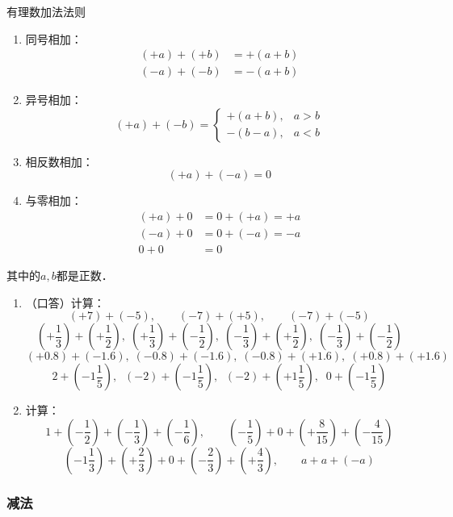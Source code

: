 \begin{blk}{有理数加法法则}
\begin{enumerate}
    \item 同号相加：
    \[\begin{split}
        (+a)+(+b)&=+(a+b)\\
      (-a)+(-b)&=-(a+b)
    \end{split}\]
    \item 异号相加：
    \[(+a)+(-b)=\begin{cases}
        +(a+b),& a>b\\
-(b-a),&a<b
    \end{cases}\]
    \item 相反数相加：
    \[(+a)+(-a)=0\]
    \item 与零相加：
    \[\begin{split}
        (+a)+0&=0+(+a)=+a\\
      (-a)+0&=0+(-a)=-a\\
    0+0&=0
    \end{split}\]
\end{enumerate}    
其中的$a,b$都是正数．
\end{blk}
      
\begin{ex}
\begin{enumerate}
    \item （口答）计算：
\[(+7)+(-5),\qquad (-7)+(+5),\qquad (-7)+(-5) \]
\[\left(+\frac{1}{3}\right)+\left(+\frac{1}{2}\right),\; \left(+\frac{1}{3}\right)+\left(-\frac{1}{2}\right),\; \left(-\frac{1}{3}\right)+\left(+\frac{1}{2}\right) ,\; \left(-\frac{1}{3}\right)+\left(-\frac{1}{2}\right) \]
\[(+0.8)+(-1.6),\; (-0.8)+(-1.6),\; (-0.8)+(+1.6),\; (+0.8)+(+1.6) \]
\[2+\left(-1\frac{1}{5}\right),\;\;(-2)+\left(-1\frac{1}{5}\right),\;\;(-2)+\left(+1\frac{1}{5}\right),\;\; 0+\left(-1\frac{1}{5}\right)\]
\item 计算：
\[1+\left(-\frac{1}{2}\right)+\left(-\frac{1}{3}\right)+\left(-\frac{1}{6}\right),\qquad \left(-\frac{1}{5}\right)+0+\left(+\frac{8}{15}\right)+\left(-\frac{4}{15}\right) \]
\[\left(-1\frac{1}{3}\right)+\left(+\frac{2}{3}\right)+0+\left(-\frac{2}{3}\right)+\left(+\frac{4}{3}\right),\qquad a+a+(-a) \]
\end{enumerate}
\end{ex}

\subsubsection{减法}


